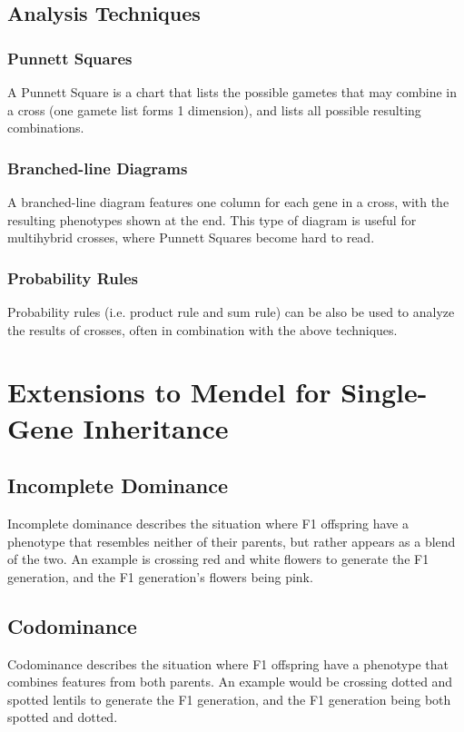 \documentclass[12pt,titlepage]{article}
\begin{document}
    \subsection{Analysis Techniques}
      \subsubsection{Punnett Squares}
        A Punnett Square is a chart that lists the possible gametes that may combine in a cross (one gamete list forms 1 dimension), and lists all
        possible resulting combinations.

      \subsubsection{Branched-line Diagrams}
        A branched-line diagram features one column for each gene in a cross, with the resulting phenotypes shown at the end. This type of diagram
        is useful for multihybrid crosses, where Punnett Squares become hard to read.

      \subsubsection{Probability Rules}
        Probability rules (i.e. product rule and sum rule) can be also be used to analyze the results of crosses, often in combination with the above
        techniques.

  \newpage

  \section{Extensions to Mendel for Single-Gene Inheritance}
    \subsection{Incomplete Dominance}
      Incomplete dominance describes the situation where F1 offspring have a phenotype that resembles neither of their parents, but rather appears as a blend
      of the two. An example is crossing red and white flowers to generate the F1 generation, and the F1 generation's flowers being pink.

    \subsection{Codominance}
      Codominance describes the situation where F1 offspring have a phenotype that combines features from both parents. An example would be crossing dotted and
      spotted lentils to generate the F1 generation, and the F1 generation being both spotted and dotted.
\end{document}
